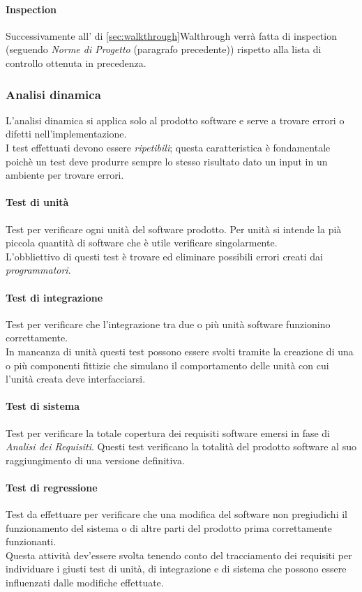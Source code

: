 \documentclass{scalatekids-article}
\begin{document}
\paragraph{Inspection}
\label{sec:inspection}Successivamente all' di \ref{sec:walkthrough}{Walthrough} verrà fatta  di inspection (seguendo \textit{Norme di Progetto} (paragrafo precedente)) rispetto alla lista di controllo ottenuta in precedenza.
\subsubsection{Analisi dinamica}
L'analisi dinamica si applica solo al prodotto software e serve a trovare errori o difetti nell'implementazione.\\I test effettuati devono essere \textit{ripetibili}; questa caratteristica è fondamentale poichè un test deve produrre sempre lo stesso risultato dato un input in un ambiente per trovare errori.
\paragraph{Test di unità}
Test per verificare ogni unità del software prodotto. Per unità si intende la pià piccola quantità di software che è utile verificare singolarmente.\\L'obbliettivo di questi test è trovare ed eliminare possibili errori creati dai \textit{programmatori}.
\paragraph{Test di integrazione}
Test per verificare che l'integrazione tra due o più unità software funzionino correttamente.\\In mancanza di unità questi test possono essere svolti tramite la creazione di una o più componenti fittizie che simulano il comportamento delle unità con cui l'unità creata deve interfacciarsi. %
\paragraph{Test di sistema}
Test per verificare la totale copertura dei requisiti software emersi in fase di \textit{Analisi dei Requisiti}. Questi test verificano la totalità del prodotto software al suo raggiungimento di una versione definitiva.
\paragraph{Test di regressione}
Test da effettuare per verificare che una modifica del software non pregiudichi il funzionamento del sistema o di altre parti del prodotto prima correttamente funzionanti.\\
Questa attività dev'essere svolta tenendo conto del tracciamento dei requisiti per individuare i giusti test di unità, di integrazione e di sistema che possono essere influenzati dalle modifiche effettuate.\\
\end{document}
